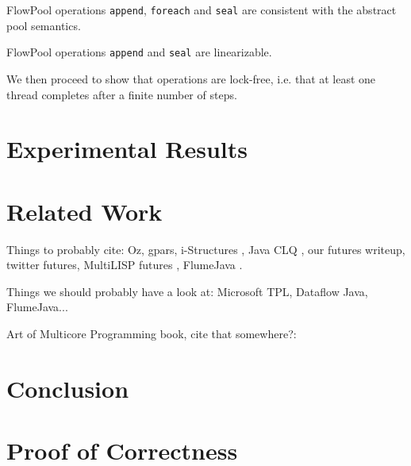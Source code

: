 \documentclass[runningheads,a4paper]{llncs}
\begin{document}
\begin{theorem}[Safety]
FlowPool operations \verb=append=, \verb=foreach=
and \verb=seal= are consistent with the abstract pool semantics.
\end{theorem}


\begin{theorem}
FlowPool operations \verb=append= and \verb=seal= are linearizable.
\end{theorem}

We then proceed to show that operations are lock-free, i.e. that at
least one thread completes after a finite number of steps.


\section{Experimental Results}

\section{Related Work}
Things to probably cite: Oz, gpars, i-Structures \cite{Arvind89}, Java CLQ \cite{Michael96}, our futures writeup, twitter futures, MultiLISP futures \cite{Halstead85}, FlumeJava \cite{Chambers10}.

Things we should probably have a look at: Microsoft TPL, Dataflow
Java, FlumeJava...

Art of Multicore Programming book, cite that somewhere?: \cite{Herlihy08}

\section{Conclusion}






\appendix
\section{Proof of Correctness}


\setcounter{lemma}{0}
\setcounter{theorem}{0}
\setcounter{corollary}{0}
\setcounter{definition}{0}
\end{document}
